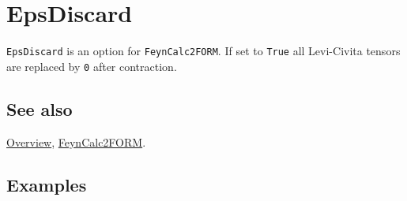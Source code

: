 \documentclass[../FeynCalcManual.tex]{subfiles}
\begin{document}
\hypertarget{epsdiscard}{%
\section{EpsDiscard}\label{epsdiscard}}

\texttt{EpsDiscard} is an option for \texttt{FeynCalc2FORM}. If set to
\texttt{True} all Levi-Civita tensors are replaced by \texttt{0} after
contraction.

\subsection{See also}

\hyperlink{toc}{Overview}, \hyperlink{feyncalc2form}{FeynCalc2FORM}.

\subsection{Examples}
\end{document}
